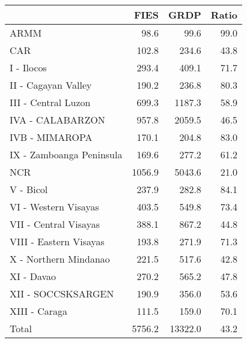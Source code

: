 \begin{tabular}{lrrr}
\toprule
{} &    FIES &     GRDP &  Ratio \\
\midrule
ARMM                     &    98.6 &     99.6 &   99.0 \\
CAR                      &   102.8 &    234.6 &   43.8 \\
I - Ilocos               &   293.4 &    409.1 &   71.7 \\
II - Cagayan Valley      &   190.2 &    236.8 &   80.3 \\
III - Central Luzon      &   699.3 &   1187.3 &   58.9 \\
IVA - CALABARZON         &   957.8 &   2059.5 &   46.5 \\
IVB - MIMAROPA           &   170.1 &    204.8 &   83.0 \\
IX - Zamboanga Peninsula &   169.6 &    277.2 &   61.2 \\
NCR                      &  1056.9 &   5043.6 &   21.0 \\
V - Bicol                &   237.9 &    282.8 &   84.1 \\
VI - Western Visayas     &   403.5 &    549.8 &   73.4 \\
VII - Central Visayas    &   388.1 &    867.2 &   44.8 \\
VIII - Eastern Visayas   &   193.8 &    271.9 &   71.3 \\
X - Northern Mindanao    &   221.5 &    517.6 &   42.8 \\
XI - Davao               &   270.2 &    565.2 &   47.8 \\
XII - SOCCSKSARGEN       &   190.9 &    356.0 &   53.6 \\
XIII - Caraga            &   111.5 &    159.0 &   70.1 \\
Total                    &  5756.2 &  13322.0 &   43.2 \\
\bottomrule
\end{tabular}
